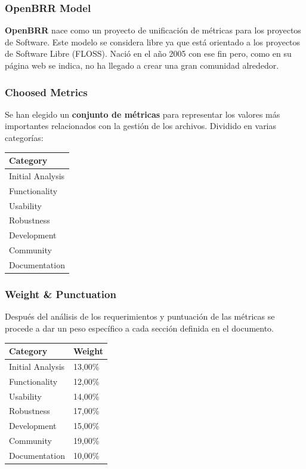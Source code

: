 \documentclass[xcolor=dvipsnames]{beamer}
\begin{document}
\begin{frame}[allowframebreaks]
\frametitle{OpenBRR Model}

\textbf{OpenBRR} nace como un proyecto de unificaci\'on de m\'etricas para los proyectos de Software. Este modelo se considera libre ya que est\'a orientado a los proyectos de Software Libre (FLOSS). Naci\'o en el a\~no 2005 con ese fin pero, como en su p\'agina web se indica, no ha llegado a crear una gran comunidad alrededor.

\end{frame}

\begin{frame}[allowframebreaks]
\frametitle{Choosed Metrics}

Se han elegido un \textbf{conjunto de m\'etricas} para representar los valores m\'as importantes relacionados con la gesti\'on de los archivos. Dividido en varias categor\'ias:

\begin{tabular}{|l|}
    \hline {\bf Category}\\
    \hline Initial Analysis\\
    \hline Functionality\\
    \hline Usability\\
    \hline Robustness\\
    \hline Development\\
    \hline Community\\
    \hline Documentation\\
    \hline
\end{tabular}

\end{frame}

\begin{frame}[allowframebreaks]
\frametitle{Weight \& Punctuation}

\par Despu\'es del an\'alisis de los requerimientos y puntuaci\'on de las m\'etricas se procede a dar un peso espec\'ifico a cada secci\'on definida en el documento. 

\begin{tabular}{|l|l|}
    \hline {\bf Category} & {\bf Weight}\\
    \hline Initial Analysis	 & 13,00\%\\
    \hline Functionality & 12,00\%\\
    \hline Usability & 14,00\%\\
    \hline Robustness & 17,00\%\\
    \hline Development & 15,00\%\\
    \hline Community & 19,00\%\\
    \hline Documentation & 10,00\%\\
    \hline
\end{tabular}

\end{frame}
\end{document}
